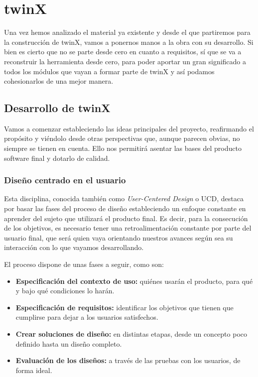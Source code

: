 \chapter{twinX}

Una vez hemos analizado el material ya existente y desde el que partiremos para la construcción de twinX, vamos a ponernos manos a la obra con su desarrollo. Si bien es cierto que no se parte desde cero en cuanto a requisitos, sí que se va a reconstruir la herramienta desde cero, para poder aportar un gran significado a todos los módulos que vayan a formar parte de twinX y así podamos cohesionarlos de una mejor manera.

\section{Desarrollo de twinX}

Vamos a comenzar estableciendo las ideas principales del proyecto, reafirmando el propósito y viéndolo desde otras perspectivas que, aunque parecen obvias, no siempre se tienen en cuenta. Ello nos permitirá asentar las bases del producto software final y dotarlo de calidad.

\subsection{Diseño centrado en el usuario}

Esta disciplina, conocida también como \textit{User-Centered Design} o UCD, destaca por basar las fases del proceso de diseño estableciendo un enfoque constante en aprender del sujeto que utilizará el producto final. Es decir, para la consecución de los objetivos, es necesario tener una retroalimentación constante por parte del usuario final, que será quien vaya orientando nuestros avances según sea su interacción con lo que vayamos desarrollando.

El proceso dispone de unas fases a seguir, como son:
\begin{itemize}
	\item \textbf{Especificación del contexto de uso:} quiénes usarán el producto, para qué y bajo qué condiciones lo harán.
	\item \textbf{Especificación de requisitos:} identificar los objetivos que tienen que cumplirse para dejar a los usuarios satisfechos.
	\item \textbf{Crear soluciones de diseño:} en distintas etapas, desde un concepto poco definido hasta un diseño completo.
	\item \textbf{Evaluación de los diseños:} a través de las pruebas con los usuarios, de forma ideal.
\end{itemize}

